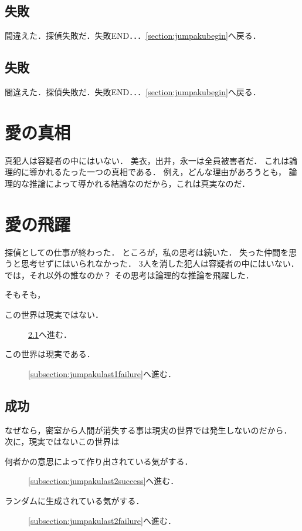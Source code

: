 \subsection{失敗}\label{section:jumpakufailure26}間違えた．探偵失敗だ．失敗END．．．\ref{section:jumpakubegin}へ戻る．\newpage
\subsection{失敗}\label{section:jumpakufailure27}間違えた．探偵失敗だ．失敗END．．．\ref{section:jumpakubegin}へ戻る．\newpage

\section{愛の真相}\label{section:jumpakuresult}
真犯人は容疑者の中にはいない．
美衣，出井，永一は全員被害者だ．
これは論理的に導かれるたった一つの真相である．
例え，どんな理由があろうとも，
論理的な推論によって導かれる結論なのだから，これは真実なのだ．

\section{愛の飛躍}
探偵としての仕事が終わった．
ところが，私の思考は続いた．
失った仲間を思うと思考せずにはいられなかった．
3人を消した犯人は容疑者の中にはいない．
では，それ以外の誰なのか？
その思考は論理的な推論を飛躍した．

そもそも，
\begin{description}
\item[この世界は現実ではない．] \ref{subsection:jumpakulast1success}へ進む．
\item[この世界は現実である．] \ref{subsection:jumpakulast1failure}へ進む．
\end{description}
\newpage

\subsection{成功}\label{subsection:jumpakulast1success}なぜなら，密室から人間が消失する事は現実の世界では発生しないのだから．
次に，現実ではないこの世界は
\begin{description}
\item[何者かの意思によって作り出されている気がする．] \ref{subsection:jumpakulast2success}へ進む．
\item[ランダムに生成されている気がする．] \ref{subsection:jumpakulast2failure}へ進む．
\end{description}
\newpage

